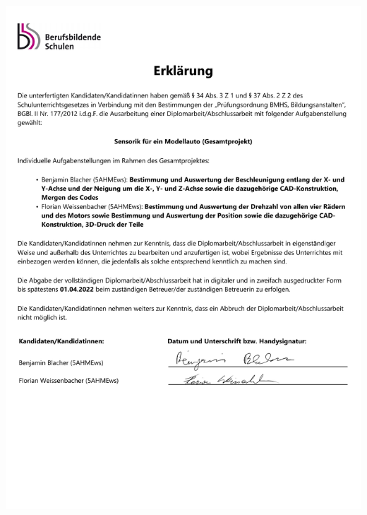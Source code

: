 \documentclass[fontsize=12pt]{article}
\makeatletter
\newcommand\ChapVersion[1]{\def\@ChapVersion{#1}}
\makeatother
\begin{document}
\ChapVersion{B. Blacher, F. Weissenbacher}
\includegraphics[page=1, scale=0.7]{./sources/DADB.pdf}
\newpage

\newpage

\newpage
\tableofcontents
\newpage

\newpage

\newpage
\ChapVersion{B. Blacher}

\newpage

\newpage

\newpage
\ChapVersion{F. Weissenbacher}

\newpage

\newpage

\newpage
\ChapVersion{B. Blacher}

\newpage

\newpage
\ChapVersion{B. Blacher, F. Weissenbacher}

\newpage
\printbibliography
\newpage

\newpage

\newpage

\end{document}
